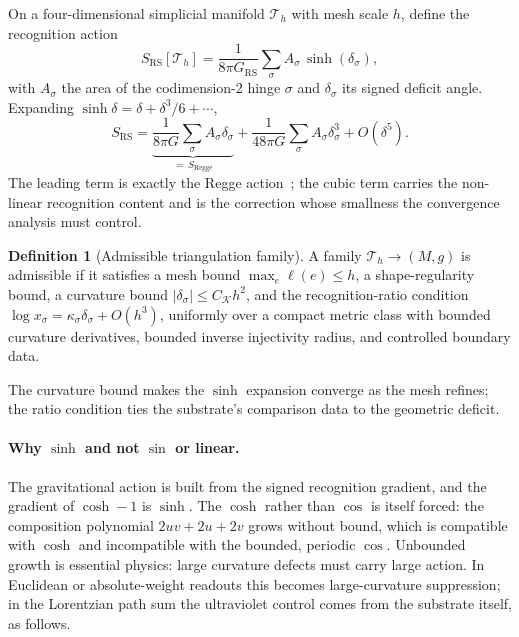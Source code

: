 \documentclass[11pt,letterpaper]{article}
\theoremstyle{definition}
\newtheorem{definition}[theorem]{Definition}
\newcommand{\RS}{\mathrm{RS}}
\newcommand{\Reg}{\mathrm{Regge}}
\begin{document}
On a four-dimensional simplicial manifold $\mathcal{T}_h$ with mesh
scale $h$, define the recognition action
\begin{equation}\label{eq:SRS}
S_\RS[\mathcal{T}_h]
=\frac{1}{8\pi G_\RS}\sum_{\sigma}A_\sigma\,\sinh(\delta_\sigma),
\end{equation}
with $A_\sigma$ the area of the codimension-2 hinge $\sigma$ and
$\delta_\sigma$ its signed deficit angle.  Expanding
$\sinh\delta=\delta+\delta^3/6+\cdots$,
\begin{equation}\label{eq:sinh-expand}
S_\RS=\underbrace{\frac{1}{8\pi G}\sum_\sigma
A_\sigma\delta_\sigma}_{=\,S_\Reg}
+\frac{1}{48\pi G}\sum_\sigma A_\sigma\delta_\sigma^{3}
+O(\delta^5).
\end{equation}
The leading term is exactly the Regge action~\cite{Regge1961}; the
cubic term carries the non-linear recognition content and is the
correction whose smallness the convergence analysis must control.

\begin{definition}[Admissible triangulation family]
A family $\mathcal{T}_h\to(M,g)$ is admissible if it satisfies a mesh
bound $\max_e \ell(e)\le h$, a shape-regularity bound, a curvature
bound $|\delta_\sigma|\le C_{\mathcal K}h^2$, and the
recognition-ratio condition $\log x_\sigma=\kappa_\sigma\delta_\sigma
+O(h^3)$, uniformly over a compact metric class with bounded curvature
derivatives, bounded inverse injectivity radius, and controlled
boundary data.
\end{definition}

The curvature bound makes the $\sinh$ expansion converge as the mesh
refines; the ratio condition ties the substrate's comparison data to
the geometric deficit.

\paragraph{Why $\sinh$ and not $\sin$ or linear.}
The gravitational action is built from the signed recognition
gradient, and the gradient of $\cosh-1$ is $\sinh$.  The $\cosh$
rather than $\cos$ is itself forced: the composition polynomial
$2uv+2u+2v$ grows without bound, which is compatible with $\cosh$ and
incompatible with the bounded, periodic $\cos$.  Unbounded growth is
essential physics: large curvature defects must carry large action.
In Euclidean or absolute-weight readouts this becomes large-curvature
suppression; in the Lorentzian path sum the ultraviolet control comes
from the substrate itself, as follows.
\end{document}
